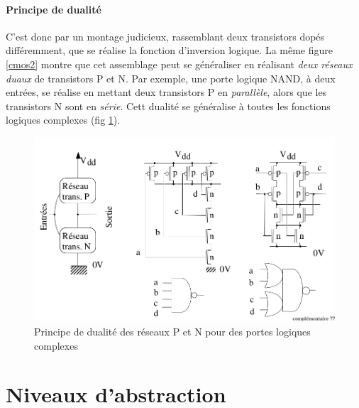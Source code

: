 \paragraph{Principe de dualité}

C'est donc par un montage judicieux, rassemblant deux transistors dopés différemment, que se réalise la fonction d'inversion logique.
La même figure \ref{cmos2} montre que cet assemblage peut se généraliser en réalisant {\it deux réseaux duaux} de transistors P et N.
Par exemple, une porte logique NAND, à deux entrées, se réalise en mettant deux transistors P en {\it parallèle}, alors que les transistors N sont en {\it série}.
Cett dualité se généralise à toutes les fonctions logiques complexes (fig \ref{cmos3}).

\begin{figure}[htb]
  \begin{center}
    \includegraphics[scale=0.4]{figures/complementaires_2.png}
    \caption{Principe de dualité des réseaux P et N pour des portes logiques complexes}
    \label{cmos3}
  \end{center}
\end{figure}

\section{Niveaux d'abstraction}

